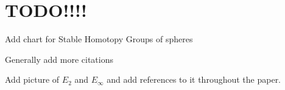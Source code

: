 \section{TODO!!!!}



Add chart for Stable Homotopy Groups of spheres

Generally add more citations

Add picture of $E_2$ and $E_\infty$ and add references to it throughout the paper.  
